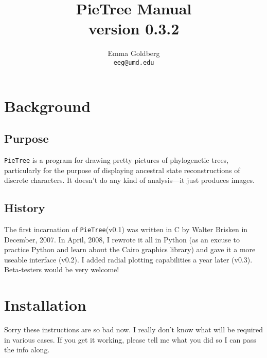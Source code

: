 \documentclass[10pt]{article}
\newcommand{\PT}{\texttt{PieTree}\xspace}
\begin{document}
\title{
	\vspace{-20pt}
	\Large{ {\bf PieTree} Manual} \\
	\large{ version 0.3.2 } 
}
\author{
	\large{Emma Goldberg} \\
	\large{\texttt{eeg@umd.edu}} 
}
\maketitle


\tableofcontents


\section*{Background}

\subsection*{Purpose}

\PT is a program for drawing pretty pictures of phylogenetic trees, particularly for the purpose of displaying ancestral state reconstructions of discrete characters.
It doesn't do any kind of analysis---it just produces images.

\subsection*{History}

The first incarnation of \PT (v0.1) was written in C by Walter Brisken in December, 2007.
In April, 2008, I rewrote it all in Python (as an excuse to practice Python and learn about the Cairo graphics library) and gave it a more useable interface (v0.2).
I added radial plotting capabilities a year later (v0.3).
Beta-testers would be very welcome!


\section*{Installation}

Sorry these instructions are so bad now. 
I really don't know what will be required in various cases.
If you get it working, please tell me what you did so I can pass the info along.
\end{document}

